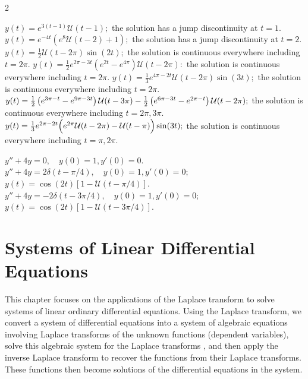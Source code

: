 \begin{multicols}{2}
\begin{Answer}[ref={EX75}]
	\Question\label{7-5-10a}
	\begin{tasks}
		\task $y(t) = e^{3 (t-1)} \mathcal{U} (t-1);$ the solution has a jump discontinuity at $t=1.$
		\task $y(t) = e^{-4 t} \left(e^8 \mathcal{U} (t-2)+1\right);$ the solution has a jump discontinuity at $t =2.$
		\task $y(t) = \frac12 \mathcal{U}(t-2\pi) \sin (2t);$ the solution is continuous everywhere including $t= 2\pi$.
		\task $y(t)= \frac{1}{2} e^{2 \pi -3 t} \left(e^{2 t}-e^{4 \pi }\right) \mathcal{U} (t-2 \pi ):$ the solution  is continuous everywhere including $t = 2\pi.$
		\task $y(t) = \frac{1}{3} e^{4 \pi -2 t} \mathcal{U} (t-2 \pi ) \sin (3 t);$ the solution  is continuous everywhere including $t = 2\pi.$
		\task $y(t) = \frac{1}{2}  \left(e^{3\pi-t }-e^{9\pi-3t }\right) \mathcal{U} (t-3 \pi )\\- \frac{1}{2} \left(e^{6 \pi-3t }-e^{2\pi- t}\right) \mathcal{U} (t-2 \pi );$
		the solution  is continuous everywhere including $t = 2\pi, 3\pi.$
		\task $y(t) = \frac{1}{3} e^{2 \pi -2 t} \Big(e^{2 \pi } \mathcal{U} (t-2 \pi )\\-\mathcal{U} (t-\pi )\Big)\sin (3 t);$
			the solution  is continuous everywhere including $t = \pi, 2\pi.$
	\end{tasks}


	\Question\label{7-5-11a}
	\begin{tasks}
	\task $y'' + 4y =0, \quad y(0) = 1, y'(0) =0.$
	\task $y'' + 4y =2 \delta(t- \pi/4), \quad y(0) = 1, y'(0) =0$; $y(t) = \cos(2t) [1- \mathcal{U}(t-\pi/4)].$
	\task$y'' + 4y =-2 \delta(t- 3\pi/4), \quad y(0) = 1, y'(0) =0$; $y(t) = \cos(2t) [1- \mathcal{U}(t-3\pi/4)].$
\end{tasks}

	\end{Answer}
\end{multicols}



\section{Systems of Linear Differential Equations}
This chapter focuses on the applications of the Laplace transform  to solve systems of linear ordinary differential equations. Using the Laplace transform, we convert a system of differential equations  into a system of algebraic equations involving  Laplace transforms of the unknown functions (dependent variables), solve this algebraic system for the Laplace transforms , and then apply the inverse Laplace transform to recover the functions from their Laplace transforms.  These functions then become solutions of the differential equations in the system.


